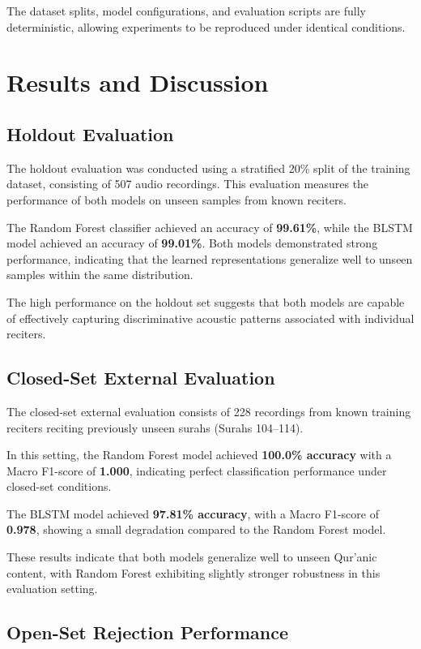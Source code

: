 \documentclass[conference]{IEEEtran}
\begin{document}
The dataset splits, model configurations, and evaluation scripts are fully deterministic, allowing experiments to be reproduced under identical conditions.

\section{Results and Discussion}
\fontsize{11}{13}\selectfont

\subsection{Holdout Evaluation}

The holdout evaluation was conducted using a stratified 20\% split of the training dataset, consisting of 507 audio recordings. This evaluation measures the performance of both models on unseen samples from known reciters.

The Random Forest classifier achieved an accuracy of \textbf{99.61\%}, while the BLSTM model achieved an accuracy of \textbf{99.01\%}. Both models demonstrated strong performance, indicating that the learned representations generalize well to unseen samples within the same distribution.

The high performance on the holdout set suggests that both models are capable of effectively capturing discriminative acoustic patterns associated with individual reciters.

\subsection{Closed-Set External Evaluation}

The closed-set external evaluation consists of 228 recordings from known training reciters reciting previously unseen surahs (Surahs 104--114).

In this setting, the Random Forest model achieved \textbf{100.0\% accuracy} with a Macro F1-score of \textbf{1.000}, indicating perfect classification performance under closed-set conditions.

The BLSTM model achieved \textbf{97.81\% accuracy}, with a Macro F1-score of \textbf{0.978}, showing a small degradation compared to the Random Forest model.

These results indicate that both models generalize well to unseen Qur'anic content, with Random Forest exhibiting slightly stronger robustness in this evaluation setting.

\subsection{Open-Set Rejection Performance}
\end{document}
